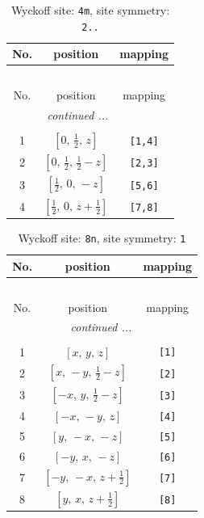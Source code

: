 \documentclass[fleqn,8pt]{jsarticle}
\begin{document}
\renewcommand{\arraystretch}{1.2}
\begin{longtable}{ccc}
\caption{Wyckoff site: {\tt 4m}, site symmetry: {\tt 2..}}
 \\
 \hline \hline
No. & position & mapping \\ \hline \endfirsthead

\multicolumn{2}{l}{\tablename\ \thetable{}} \\
 \hline \hline
No. & position & mapping \\ \hline \endhead

 \hline \hline
\multicolumn{2}{r}{\footnotesize\it continued ...} \\ \endfoot

 \hline \hline
\multicolumn{2}{r}{} \\ \endlastfoot

1 & $\left[ 0,\, \frac{1}{2},\, z \right]$ & {\tt [1,4]} \\ \hline
2 & $\left[ 0,\, \frac{1}{2},\, \frac{1}{2} - z \right]$ & {\tt [2,3]} \\ \hline
3 & $\left[ \frac{1}{2},\, 0,\, - z \right]$ & {\tt [5,6]} \\ \hline
4 & $\left[ \frac{1}{2},\, 0,\, z + \frac{1}{2} \right]$ & {\tt [7,8]} \\
\end{longtable}
\renewcommand{\arraystretch}{1.2}
\begin{longtable}{ccc}
\caption{Wyckoff site: {\tt 8n}, site symmetry: {\tt 1}}
 \\
 \hline \hline
No. & position & mapping \\ \hline \endfirsthead

\multicolumn{2}{l}{\tablename\ \thetable{}} \\
 \hline \hline
No. & position & mapping \\ \hline \endhead

 \hline \hline
\multicolumn{2}{r}{\footnotesize\it continued ...} \\ \endfoot

 \hline \hline
\multicolumn{2}{r}{} \\ \endlastfoot

1 & $\left[ x,\, y,\, z \right]$ & {\tt [1]} \\ \hline
2 & $\left[ x,\, - y,\, \frac{1}{2} - z \right]$ & {\tt [2]} \\ \hline
3 & $\left[ - x,\, y,\, \frac{1}{2} - z \right]$ & {\tt [3]} \\ \hline
4 & $\left[ - x,\, - y,\, z \right]$ & {\tt [4]} \\ \hline
5 & $\left[ y,\, - x,\, - z \right]$ & {\tt [5]} \\ \hline
6 & $\left[ - y,\, x,\, - z \right]$ & {\tt [6]} \\ \hline
7 & $\left[ - y,\, - x,\, z + \frac{1}{2} \right]$ & {\tt [7]} \\ \hline
8 & $\left[ y,\, x,\, z + \frac{1}{2} \right]$ & {\tt [8]} \\
\end{longtable}
\end{document}
